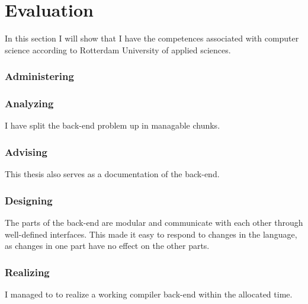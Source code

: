 \section{Evaluation}\label{evaluation}
In this section I will show that I have the competences associated with computer science according to Rotterdam University of applied sciences.

\subsubsection{Administering} 


\subsubsection{Analyzing}
I have split the back-end problem up in managable chunks.

\subsubsection{Advising}
This thesis also serves as a documentation of the back-end.

\subsubsection{Designing}
The parts of the back-end are modular and communicate with each other through well-defined interfaces.
This made it easy to respond to changes in the language, as changes in one part have no effect on the other parts.

\subsubsection{Realizing}
I managed to to realize a working compiler back-end within the allocated time.
